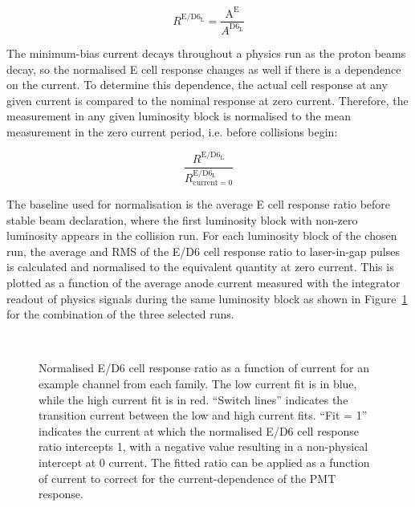 \begin{equation}\label{eq:Ecell_nD6L}
R^{\mathrm{E/D6_L}} = \frac{\mathrm{A^E}}{A^{\mathrm{D6_L}}}
\end{equation}

The minimum-bias current decays throughout a physics run as the proton beams decay, so the normalised E cell response changes as well if there is a dependence on the current. To determine this dependence, the actual cell response at any given current is compared to the nominal response at zero current. Therefore, the measurement in any given luminosity block is normalised to the mean measurement in the zero current period, i.e. before collisions begin:

\begin{equation}\label{eq:normalisedEcell_nD6L}
\frac{R^{\mathrm{E/D6_L}}}{R_{\mathrm{current=0}}^{\mathrm{E/D6_L}}}
\end{equation}

The baseline used for normalisation is the average E cell response ratio before stable beam declaration, where the first luminosity block with non-zero luminosity appears in the collision run. For each luminosity block of the chosen run, the average and RMS of the E/D6 cell response ratio to laser-in-gap pulses is calculated and normalised to the equivalent quantity at zero current. This is plotted as a function of the average anode current measured with the integrator readout of physics signals during the same luminosity block as shown in Figure~\ref{fig:fittedLiG} for the combination of the three selected runs.

\begin{figure}[htbp]
\begin{center}
\\
\caption{Normalised E/D6 cell response ratio as a function of current for an example channel from each family. The low current fit is in blue, while the high current fit is in red. ``Switch lines'' indicates the transition current between the low and high current fits. ``Fit = 1'' indicates the current at which the normalised E/D6 cell response ratio intercepts 1, with a negative value resulting in a non-physical intercept at 0 current. The fitted ratio can be applied as a function of current to correct for the current-dependence of the PMT response.}
\label{fig:fittedLiG}
\end{center}
\end{figure}

